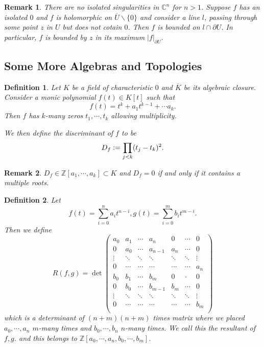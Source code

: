 \documentclass{article}
\newtheorem{definition}{Definition}[section]
\newtheorem{remark}{Remark}[section]
\newcommand{\defeq}{\vcentcolon=}
\newcommand{\Z}[0]{\mathbb{Z}}
\newcommand{\C}[0]{\mathbb{C}}
\begin{document}
\begin{remark}
There are no isolated singularities in $\C^n$ for $n>1$. Suppose $f$ has an isolated $0$ and $f$ is holomorphic on $\overline{U}\backslash\{0\}$ and consider a line $l$,
passing through some point $z$ in $U$ but does not cotain $0$. Then $f$ is bounded on $l\cap\partial U$. 
In particular, $f$ is bounded by $z$ in its maximum $\vert f\vert_{\partial U}$. %
\end{remark}

\subsection{Some More Algebras and Topologies}
\begin{definition}
  Let $K$ be a field of characteristic $0$ and $\overline{K}$ be its algebraic closure. Consider a monic polynomial $f(t)\in K[t]$ such that 
  \begin{equation*}
    f(t) = t^k+a_1t^{k-1}+\cdots a_k.
  \end{equation*}
  Then $f$ has $k$-many zeros $t_1,\cdots,t_k$ allowing multiplicity.
  \par We then define the discriminant of $f$ to be
  \begin{equation*}
    D_f \defeq \prod_{j<k}(t_j-t_k)^2.
  \end{equation*}
\end{definition}

\begin{remark}
  $D_f\in\Z[a_1,\cdots, a_k]\subset K$ and $D_f=0$ if and only if it contains a multiple roots.
\end{remark}

\begin{definition}
  Let 
  \begin{equation*}
    f(t) = \sum_{i=0}^n a_it^{n-i},g(t) = \sum_{i=0}^m b_it^{m-i}.
  \end{equation*}
  Then we define 
  \begin{equation*}
    R(f,g) = \det\begin{pmatrix}
      a_0 & a_1 & \cdots & a_n& 0 & \cdots & 0\\
      0 & a_0 & \cdots & a_{n-1} & a_n & \cdots & 0\\
      \vdots &\ddots & \ddots & \ddots & \ddots& \ddots & \vdots\\
      0 & \cdots & \cdots & \cdots& \cdots & \cdots & a_n\\
      b_0 & b_1 & \cdots & b_m& 0 & \cdot & 0\\
      0 & b_0 & \cdots & b_{m-1} & b_m & \cdots & 0\\
      \vdots & \ddots & \ddots & \ddots & \ddots &\ddots& \vdots\\
      0 & \cdots & \cdots & \cdots& \cdots & \cdots & b_m\\
    \end{pmatrix}
  \end{equation*}
  which is a determinant of $(n+m)(n+m)$ times matrix where we placed $a_0,\cdots,a_n$ $m$-many times and $b_0,\cdots,b_n$ $n$-many times. We call this the resultant of $f,g$. and this belongs to $\Z[a_0,\cdots,a_n,b_0,\cdots,b_m]$.
\end{definition}
\end{document}
